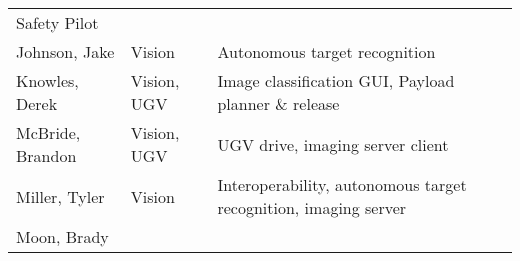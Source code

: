 \begin{longtable}[]{@{}lll@{}}
\begin{minipage}[t]{0.30\columnwidth}
{Safety Pilot}\strut
\end{minipage}\tabularnewline
\begin{minipage}[t]{0.30\columnwidth}\raggedright\strut
{Johnson, Jake}\strut
\end{minipage} & \begin{minipage}[t]{0.30\columnwidth}\raggedright\strut
{Vision}\strut
\end{minipage} & \begin{minipage}[t]{0.30\columnwidth}\raggedright\strut
{Autonomous target recognition}\strut
\end{minipage}\tabularnewline
\begin{minipage}[t]{0.30\columnwidth}\raggedright\strut
{Knowles, Derek}\strut
\end{minipage} & \begin{minipage}[t]{0.30\columnwidth}\raggedright\strut
{Vision, UGV}\strut
\end{minipage} & \begin{minipage}[t]{0.30\columnwidth}\raggedright\strut
{Image classification GUI, Payload planner \& release}\strut
\end{minipage}\tabularnewline
\begin{minipage}[t]{0.30\columnwidth}\raggedright\strut
{McBride, Brandon}\strut
\end{minipage} & \begin{minipage}[t]{0.30\columnwidth}\raggedright\strut
{Vision, UGV}\strut
\end{minipage} & \begin{minipage}[t]{0.30\columnwidth}\raggedright\strut
{UGV drive, imaging server client}\strut
\end{minipage}\tabularnewline
\begin{minipage}[t]{0.30\columnwidth}\raggedright\strut
{Miller, Tyler}\strut
\end{minipage} & \begin{minipage}[t]{0.30\columnwidth}\raggedright\strut
{Vision}\strut
\end{minipage} & \begin{minipage}[t]{0.30\columnwidth}\raggedright\strut
{Interoperability, autonomous target recognition, imaging server}\strut
\end{minipage}\tabularnewline
\begin{minipage}[t]{0.30\columnwidth}\raggedright\strut
{Moon, Brady}\strut
\end{minipage} & \begin{minipage}[t]{0.30\columnwidth}\raggedright\strut

\end{minipage}
\end{longtable}
